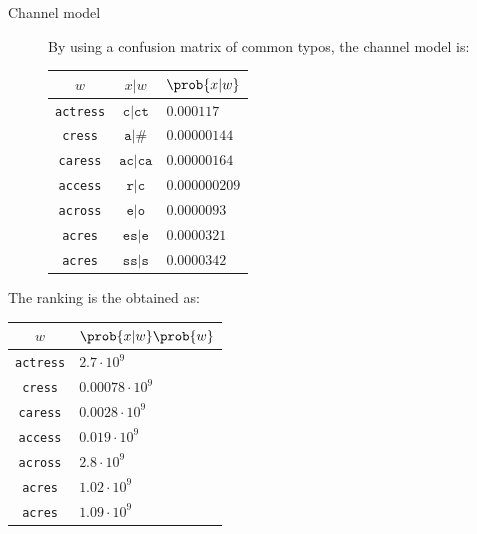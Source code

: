 \begin{example}
\begin{description}
        \item[Channel model] 
            By using a confusion matrix of common typos, the channel model is:
            \begin{table}[H]
                \centering
                \footnotesize
                \begin{tabular}{ccl}
                    \toprule
                    $w$ & $x | w$ & $\prob{x | w}$ \\
                    \midrule
                    \texttt{actress} & $\texttt{c}|\texttt{ct}$  & $0.000117$ \\
                    \texttt{cress}   & $\texttt{a}|\texttt{\#}$  & $0.00000144$ \\
                    \texttt{caress}  & $\texttt{ac}|\texttt{ca}$ & $0.00000164$ \\
                    \texttt{access}  & $\texttt{r}|\texttt{c}$   & $0.000000209$ \\
                    \texttt{across}  & $\texttt{e}|\texttt{o}$   & $0.0000093$ \\
                    \texttt{acres}   & $\texttt{es}|\texttt{e}$  & $0.0000321$ \\
                    \texttt{acres}   & $\texttt{ss}|\texttt{s}$  & $0.0000342$ \\
                    \bottomrule
                \end{tabular}
            \end{table}
    \end{description}

    The ranking is the obtained as:
    \begin{table}[H]
        \centering
        \footnotesize
        \begin{tabular}{cl}
            \toprule
            $w$ & $\prob{x | w} \prob{w}$ \\
            \midrule
            \texttt{actress} & $2.7 \cdot 10^{9}$ \\
            \texttt{cress}   & $0.00078 \cdot 10^{9}$ \\
            \texttt{caress}  & $0.0028 \cdot 10^{9}$ \\
            \texttt{access}  & $0.019 \cdot 10^{9}$ \\
            \texttt{across}  & $2.8 \cdot 10^{9}$ \\
            \texttt{acres}   & $1.02 \cdot 10^{9}$ \\
            \texttt{acres}   & $1.09 \cdot 10^{9}$ \\
            \bottomrule
        \end{tabular}
    \end{table}


\end{example}
